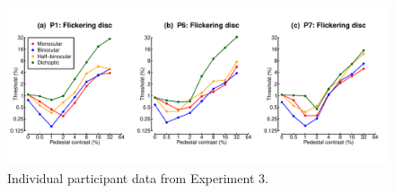 \documentclass[
]{article}
\begin{document}
\begin{figure}

{\centering \includegraphics{Figures/individualdiscs} 

}

\caption{Individual participant data from Experiment 3.}\label{fig:individualdiscs}
\end{figure}
\end{document}
